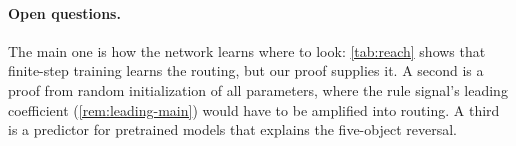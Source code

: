 \paragraph{Open questions.} The main one is how the network learns where to look: \cref{tab:reach} shows that finite-step training learns
the routing, but our proof supplies it. A second is a proof from random initialization of all parameters, where the rule signal's
leading coefficient (\cref{rem:leading-main}) would have to be amplified into routing. A third is a predictor for pretrained models that
explains the five-object reversal.

